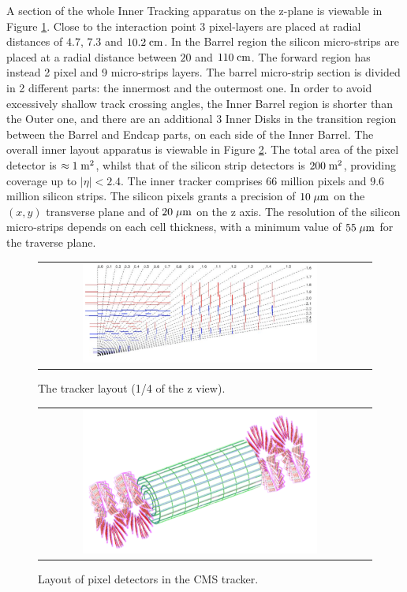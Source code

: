 A section of the whole Inner Tracking apparatus on the z-plane is viewable in Figure \ref{fig:Pixel_zview}. Close to the interaction point 3 pixel-layers are placed at radial distances of $4.7$, $7.3$ and $10.2\;\text{cm}$. In the Barrel region the silicon micro-strips are placed at a radial distance between $20$ and $110\;\text{cm}$. The forward region has instead 2 pixel and 9 micro-strips layers. The barrel micro-strip section is divided in 2 different parts: the innermost and the outermost one. In order to avoid excessively shallow track crossing angles, the Inner Barrel region is shorter than the Outer one, and there are an additional 3 Inner Disks in the transition region between the Barrel and Endcap parts, on each side of the Inner Barrel. The overall inner layout apparatus is viewable in Figure \ref{fig:Pixel_layout}. The total area of the pixel detector is $\approx 1\;\text{m}^{2}$, whilst that of the silicon strip detectors is $200\;\text{m}^{2}$, providing coverage up to $|\eta| < 2.4$. The inner tracker comprises 66 million pixels and $9.6$ million silicon strips. The silicon pixels grants a precision of $10\;\mu\text{m}$ on the $(x,y)$ transverse plane and of $20\;\mu\text{m}$ on the z axis. The resolution of the silicon micro-strips depends on each cell thickness, with a minimum value of $ 55\;\mu\text{m}$ for the traverse plane.


\begin{figure}[tbh!]
	\centering
	\begin{tabular}{cc}
		\includegraphics[width=0.75\textwidth]{detector/pics/Pixel_zview.pdf}
	\end{tabular}
	\caption{The tracker layout (1/4 of the z view).}
	\label{fig:Pixel_zview}
\end{figure}

\begin{figure}[tbh!]
	\centering
	\begin{tabular}{cc}
		\includegraphics[width=0.75\textwidth]{detector/pics/Pixel_layout.pdf}
	\end{tabular}
	\caption{Layout of pixel detectors in the CMS tracker.}
	\label{fig:Pixel_layout}
\end{figure}

